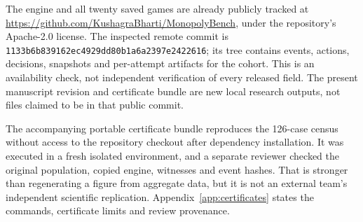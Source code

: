 The engine and all twenty saved games are already publicly tracked at \url{https://github.com/KushagraBharti/MonopolyBench}, under the repository's Apache-2.0 license. The inspected remote commit is \texttt{1133b6b839162ec4929dd80b1a6a2397e2422616}; its tree contains events, actions, decisions, snapshots and per-attempt artifacts for the cohort. This is an availability check, not independent verification of every released field. The present manuscript revision and certificate bundle are new local research outputs, not files claimed to be in that public commit.

The accompanying portable certificate bundle reproduces the 126-case census without access to the repository checkout after dependency installation. It was executed in a fresh isolated environment, and a separate reviewer checked the original population, copied engine, witnesses and event hashes. That is stronger than regenerating a figure from aggregate data, but it is not an external team's independent scientific replication. Appendix~\ref{app:certificates} states the commands, certificate limits and review provenance.

